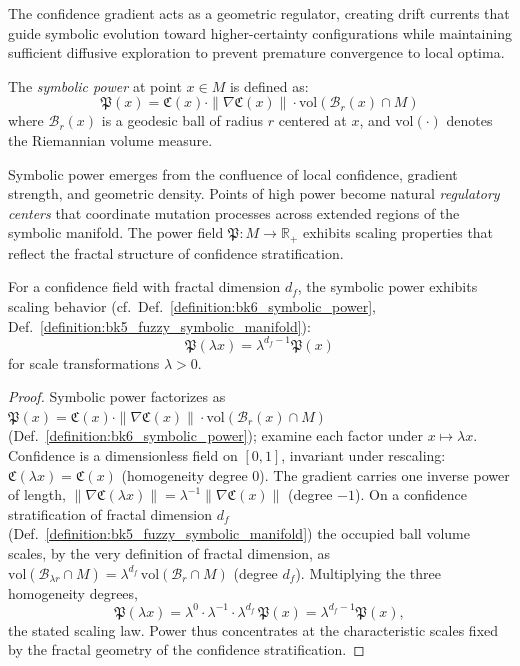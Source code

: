 The confidence gradient acts as a geometric regulator, creating drift currents that guide symbolic evolution toward higher-certainty configurations while maintaining sufficient diffusive exploration to prevent premature convergence to local optima.

\begin{definition}
\label{definition:bk6_symbolic_power}
The \emph{symbolic power} at point $x \in M$ is defined as:
\begin{equation}
\mathfrak{P}(x) = \mathfrak{C}(x) \cdot \|\nabla \mathfrak{C}(x)\| \cdot \text{vol}(\mathcal{B}_r(x) \cap M)
\end{equation}
where $\mathcal{B}_r(x)$ is a geodesic ball of radius $r$ centered at $x$, and $\text{vol}(\cdot)$ denotes the Riemannian volume measure.
\end{definition}

Symbolic power emerges from the confluence of local confidence, gradient strength, and geometric density. Points of high power become natural \emph{regulatory centers} that coordinate mutation processes across extended regions of the symbolic manifold. The power field $\mathfrak{P}: M \to \mathbb{R}_+$ exhibits scaling properties that reflect the fractal structure of confidence stratification.

\begin{lemma}
\label{lemma:bk6_power_scaling}
For a confidence field with fractal dimension $d_f$, the symbolic power exhibits scaling behavior (cf.~Def.~\ref{definition:bk6_symbolic_power}, Def.~\ref{definition:bk5_fuzzy_symbolic_manifold}):
\begin{equation}
\mathfrak{P}(\lambda x) = \lambda^{d_f - 1} \mathfrak{P}(x)
\end{equation}
for scale transformations $\lambda > 0$.
\end{lemma}
\begin{proof}
\label{proof:bk6_power_scaling}
\leavevmode
Symbolic power factorizes as $\mathfrak{P}(x)=\mathfrak{C}(x)\cdot\|\nabla\mathfrak{C}(x)\|\cdot\text{vol}(\mathcal{B}_r(x)\cap M)$ (Def.~\ref{definition:bk6_symbolic_power}); examine each factor under $x\mapsto\lambda x$. Confidence is a dimensionless field on $[0,1]$, invariant under rescaling: $\mathfrak{C}(\lambda x)=\mathfrak{C}(x)$ (homogeneity degree $0$). The gradient carries one inverse power of length, $\|\nabla\mathfrak{C}(\lambda x)\|=\lambda^{-1}\|\nabla\mathfrak{C}(x)\|$ (degree $-1$). On a confidence stratification of fractal dimension $d_f$ (Def.~\ref{definition:bk5_fuzzy_symbolic_manifold}) the occupied ball volume scales, by the very definition of fractal dimension, as $\text{vol}(\mathcal{B}_{\lambda r}\cap M)=\lambda^{d_f}\,\text{vol}(\mathcal{B}_r\cap M)$ (degree $d_f$). Multiplying the three homogeneity degrees,
\[
\mathfrak{P}(\lambda x)=\lambda^{0}\cdot\lambda^{-1}\cdot\lambda^{d_f}\,\mathfrak{P}(x)=\lambda^{d_f-1}\mathfrak{P}(x),
\]
the stated scaling law. Power thus concentrates at the characteristic scales fixed by the fractal geometry of the confidence stratification.
\end{proof}

